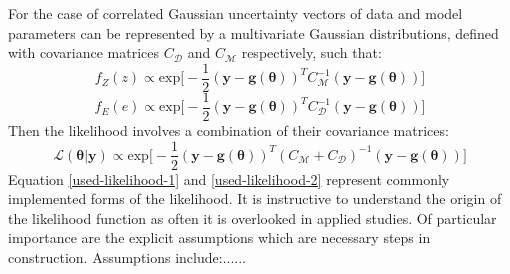 For the case of correlated Gaussian uncertainty vectors of data and model parameters can be represented by a multivariate Gaussian distributions, defined with covariance matrices $C_{\mathcal{D}}$ and $C_{\mathcal{M}}$ respectively, such that:
\begin{equation}
f_Z(z) \propto \text{exp}\bigg[-\frac{1}{2}(\bm{y}-\bm{g}(\bm{\theta}))^TC_{\mathcal{M}}^{-1}(\bm{y}-\bm{g}(\bm{\theta}))\bigg]
\end{equation}
\begin{equation}
f_E(e) \propto \text{exp}\bigg[-\frac{1}{2}(\bm{y}-\bm{g}(\bm{\theta}))^TC_{\mathcal{D}}^{-1}(\bm{y}-\bm{g}(\bm{\theta}))\bigg]
\end{equation}
Then the likelihood involves a combination of their covariance matrices:
\begin{equation}
\mathcal{L}(\bm{\theta}|\bm{y}) \propto \text{exp}\bigg[-\frac{1}{2}(\bm{y}-\bm{g}(\bm{\theta}))^T(C_{\mathcal{M}}+C_{\mathcal{D}})^{-1}(\bm{y}-\bm{g}(\bm{\theta}))\bigg]
\label{used-likelihood-2}
\end{equation}
Equation \ref{used-likelihood-1} and \ref{used-likelihood-2} represent commonly implemented forms of the likelihood. It is instructive to understand the origin of the likelihood function as often it is overlooked in applied studies. Of particular importance are the explicit assumptions which are necessary steps in construction. Assumptions include:......


